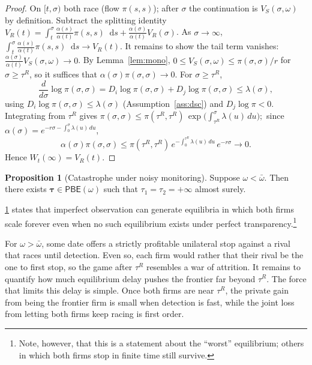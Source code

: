 \documentclass[12pt,reqno]{article}
\newcommand{\de}{\mathop{}\!\mathrm{d}}
\newcommand{\PBE}{\ensuremath{\mathsf{PBE}}}
\theoremstyle{definition} \newtheorem{example}{Example}
\theoremstyle{definition} \newtheorem{condition}{Condition}
\theoremstyle{definition} \newtheorem{corollary}{Corollary}
\theoremstyle{definition} \newtheorem{claim}{Claim}
\theoremstyle{definition} \newtheorem{definition}{Definition}
\theoremstyle{definition} \newtheorem{conjecture}{Conjecture}
\theoremstyle{definition} \newtheorem{Lemma}{Lemma}
\theoremstyle{definition} \newtheorem{lemma}{Lemma}
\theoremstyle{plain} \newtheorem{theorem}{Theorem}
\theoremstyle{definition} \newtheorem{assumption}{Assumption}
\theoremstyle{definition} \newtheorem*{assumptionnonumber}{Assumption}
\theoremstyle{definition} \newtheorem*{theoremNoNumber}{Proposition}
\theoremstyle{definition}
\theoremstyle{definition}\newtheorem{proposition}{Proposition}
\theoremstyle{definition} \newtheorem{result}{Result}
\theoremstyle{definition} \newtheorem*{definitionNoNumber}{Definition}
\theoremstyle{definition} \newtheorem{Definition}{Definition}
\theoremstyle{definition} \newtheorem*{DefinitionNoNumber}{Definition}
\theoremstyle{definition} \newtheorem*{fact}{Fact}
\theoremstyle{definition} \newtheorem*{property}{Property}
\theoremstyle{definition} \newtheorem{remark}{Remark}
\begin{document}
\begin{proof}
On $[t,\sigma)$ both race (flow $\pi(s,s)$); after $\sigma$ the continuation is $V_S(\sigma,\omega)$ by definition. Subtract the splitting identity $V_R(t)=\int_t^\sigma\frac{\alpha(s)}{\alpha(t)}\pi(s,s)\de s+\frac{\alpha(\sigma)}{\alpha(t)}V_R(\sigma)$. As $\sigma\to\infty$, $\int_t^\sigma\frac{\alpha(s)}{\alpha(t)}\pi(s,s)\de s\to V_R(t)$.
It remains to show the tail term vanishes: $\frac{\alpha(\sigma)}{\alpha(t)}V_S(\sigma,\omega)\to0$.
By Lemma~\ref{lem:mono}, $0\le V_S(\sigma,\omega)\le \pi(\sigma,\sigma)/r$ for
$\sigma\ge\tau^R$, so it suffices that $\alpha(\sigma)\pi(\sigma,\sigma)\to 0$. For $\sigma\ge\tau^R$,
\[
  \frac{d}{d\sigma}\log\pi(\sigma,\sigma)
    =D_i\log\pi(\sigma,\sigma)+D_j\log\pi(\sigma,\sigma)
    \le\lambda(\sigma),
\]
using $D_i\log\pi(\sigma,\sigma)\le\lambda(\sigma)$ (Assumption~\ref{ass:dsc})
and $D_j\log\pi<0$. Integrating from $\tau^R$ gives
$
  \pi(\sigma,\sigma)\le\pi(\tau^R,\tau^R)\,
    \exp\!\Big(\textstyle\int_{\tau^R}^{\sigma}\lambda(u)\,du\Big);$
since $\alpha(\sigma)=e^{-r\sigma-\int_0^\sigma\lambda(u)\,du}$,
\[
  \alpha(\sigma)\pi(\sigma,\sigma)
    \le \pi(\tau^R,\tau^R)\,e^{-\int_0^{\tau^R}\lambda(u)\,du}\,e^{-r\sigma}\to0 .
\] Hence $W_t(\infty)=V_R(t)$. 
\end{proof}

\begin{proposition}[Catastrophe under noisy monitoring]\label{prop:never-stop}
Suppose $\omega<\bar\omega$. Then there exists $\bm{\tau} \in \PBE(\omega)$ such that $\tau_1=\tau_2=+\infty$ almost surely. 
\end{proposition}


\cref{prop:never-stop} states that imperfect observation can generate equilibria in which both firms scale forever even when no such equilibrium exists under perfect transparency.\footnote{Note, however, that this is a statement about the ``worst'' equilibrium; others in which both firms stop in finite time still survive.} 








For $\omega>\bar\omega$, some date offers a strictly profitable unilateral stop against a rival that races until detection. Even so, each firm would rather that their rival be the one to first stop, so the game after $\tau^R$ resembles a war of attrition. It remains to quantify how much equilibrium delay pushes the frontier far beyond $\tau^R$. The force that limits this delay is simple. Once both firms are near $\tau^R$, the private gain from being the frontier firm is small when detection is fast, while the joint loss from letting both firms keep racing is first order.
\end{document}
